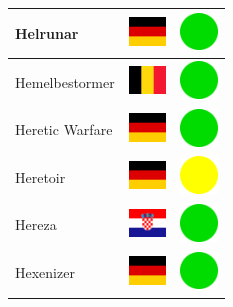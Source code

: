 \documentclass[12pt, a4paper, twoside]{report}
\begin{document}
\begin{center}
\begin{longtable}{|p{5cm}|p{2cm}|p{2cm}|}
 Helrunar                                                   & \includegraphics[width=1cm]{../img/flags/de} &   \includegraphics[width=1cm]{../likes/y} \\ \hline
 Hemelbestormer                                             & \includegraphics[width=1cm]{../img/flags/be} &   \includegraphics[width=1cm]{../likes/y} \\ \hline
 Heretic Warfare                                            & \includegraphics[width=1cm]{../img/flags/de} &   \includegraphics[width=1cm]{../likes/y} \\ \hline
 Heretoir                                                   & \includegraphics[width=1cm]{../img/flags/de} &   \includegraphics[width=1cm]{../likes/m} \\ \hline
 Hereza                                                     & \includegraphics[width=1cm]{../img/flags/hr} &   \includegraphics[width=1cm]{../likes/y} \\ \hline
 Hexenizer                                                  & \includegraphics[width=1cm]{../img/flags/de} &   \includegraphics[width=1cm]{../likes/y} \\ \hline

\end{longtable}
\end{center}
\end{document}
